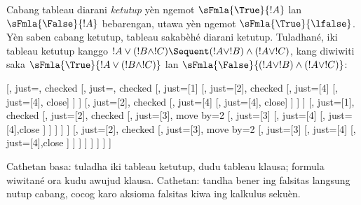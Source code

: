 \documentclass[../../../include/open-logic-section]{subfiles}
\begin{document}
Cabang tableau diarani \emph{ketutup} yèn ngemot
$\sFmla{\True}{!A}$ lan $\sFmla{\False}{!A}$
bebarengan, utawa yèn ngemot $\sFmla{\True}{\lfalse}$.
Yèn saben cabang ketutup, tableau
sakabèhé diarani ketutup. Tuladhané, iki tableau
ketutup kanggo $!A \lor (!B \land !C) \Sequent
(!A \lor !B) \land (!A \lor !C)$, kang diwiwiti
saka $\sFmla{\True}{!A \lor (!B \land !C)}$
lan $\sFmla{\False}{(!A \lor !B) \land (!A \lor !C)}$:
\begin{maxwidth}
\begin{tableau}{}
  [,
    just=\TAss, checked
    [, just=\TAss, checked
      [, just={\TRule{\True}{\lor}[1]}
        [,
          just={\TRule{\False}{\land}[2]}, checked
          [,
            just={\TRule{\False}{\lor}[4]}
            [,
              just={\TRule{\False}{\lor}[4]}, close]
          ]
        ]
        [,
          just={\TRule{\False}{\land}[2]}, checked
          [,
            just={\TRule{\False}{\lor}[4]}
            [,
              just={\TRule{\False}{\lor}[4]}, close]
          ]
        ]
      ]
      [,
        just={\TRule{\True}{\lor}[1]}, checked
        [,
          just={\TRule{\False}{\land}[2]}, checked
          [,
            just={\TRule{\True}{\land}[3]}, move by=2
            [,
              just={\TRule{\True}{\land}[3]}
              [,
                just={\TRule{\False}{\lor}[4]}
                [,
                  just={\TRule{\False}{\lor}[4]},close
                ]
              ]
            ]
          ]
        ]
        [,
          just={\TRule{\False}{\land}[2]}, checked
          [,
            just={\TRule{\True}{\land}[3]}, move by=2
              [,
                just={\TRule{\True}{\land}[3]}
                [,
                  just={\TRule{\False}{\lor}[4]}
                  [,
                  just={\TRule{\False}{\lor}[4]},close
                ]
              ]
            ]
          ]
        ]
      ]
    ]
  ]
\end{tableau}
\end{maxwidth}
Cathetan basa: tuladha iki tableau ketutup, dudu tableau klausa; formula wiwitané ora kudu awujud klausa.
Cathetan: tandha bener ing falsitas langsung nutup cabang, cocog karo aksioma falsitas kiwa ing kalkulus sekuèn.
\end{document}
